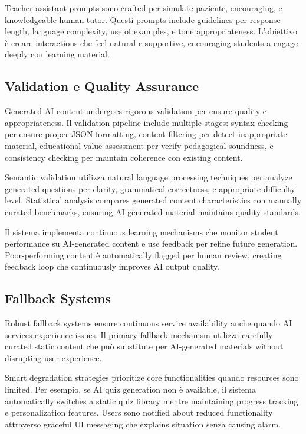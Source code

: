 \documentclass[12pt,a4paper]{article}
\begin{document}
Teacher assistant prompts sono crafted per simulate paziente, encouraging, e knowledgeable human tutor. Questi prompts include guidelines per response length, language complexity, use of examples, e tone appropriateness. L'obiettivo è creare interactions che feel natural e supportive, encouraging students a engage deeply con learning material.

\subsection{Validation e Quality Assurance}

Generated AI content undergoes rigorous validation per ensure quality e appropriateness. Il validation pipeline include multiple stages: syntax checking per ensure proper JSON formatting, content filtering per detect inappropriate material, educational value assessment per verify pedagogical soundness, e consistency checking per maintain coherence con existing content.

Semantic validation utilizza natural language processing techniques per analyze generated questions per clarity, grammatical correctness, e appropriate difficulty level. Statistical analysis compares generated content characteristics con manually curated benchmarks, ensuring AI-generated material maintains quality standards.

Il sistema implementa continuous learning mechanisms che monitor student performance su AI-generated content e use feedback per refine future generation. Poor-performing content è automatically flagged per human review, creating feedback loop che continuously improves AI output quality.

\subsection{Fallback Systems}

Robust fallback systems ensure continuous service availability anche quando AI services experience issues. Il primary fallback mechanism utilizza carefully curated static content che può substitute per AI-generated materials without disrupting user experience.

Smart degradation strategies prioritize core functionalities quando resources sono limited. Per esempio, se AI quiz generation non è available, il sistema automatically switches a static quiz library mentre maintaining progress tracking e personalization features. Users sono notified about reduced functionality attraverso graceful UI messaging che explains situation senza causing alarm.
\end{document}
